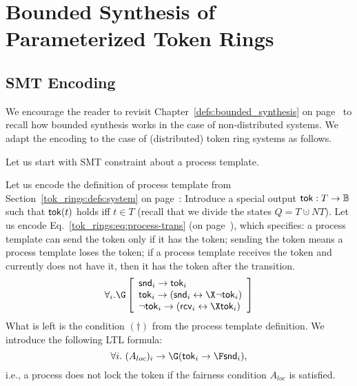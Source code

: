 \section{Bounded Synthesis of Parameterized Token Rings}\label{tok_rings:sec:bs-and-optimizations}

\subsection{SMT Encoding}

We encourage the reader to revisit Chapter~\ref{defs:bounded_synthesis} on page~\pageref{page:defs:bounded_synthesis}
to recall how bounded synthesis works in the case of non-distributed systems.
We adapt the encoding to the case of (distributed) token ring systems as follows.

Let us start with SMT constraint about a process template.

Let us encode the definition of process template from
Section~\ref{tok_rings:defs:system} on page~\pageref{tok_rings:eq:process-trans}:
%
\li
\- Introduce a special output $\mathsf{tok}: T \to \mathbb{B}$
   such that $\mathsf{tok}(t)$ holds iff $t \in T$
   (recall that we divide the states $Q = T\cupdot NT$).
   Let us encode Eq.~\ref{tok_rings:eq:process-trans} (on page~\pageref{tok_rings:eq:process-trans}),
   which specifies:
   a process template can send the token only if it has the token;
   sending the token means a process template loses the token;
   if a process template receives the token and currently does not have it,
   then it has the token after the transition.
   \begin{equation} \label{tok_rings:eq:snd_rcv_tok}
   \forall_i. \G\left[
   \begin{array}{l}
     \tsnd_i \impl \token_i \\
     \token_i \impl (\tsnd_i \iff \X\neg\token_i)\\
     \neg\token_i \impl (\trcv_i \iff \X\token_i)
   \end{array}
   \right]
   \end{equation}
%
\- What is left is the condition $(\dagger)$ from the process template definition.
   We introduce the following LTL formula:
   \begin{equation}\label{tok_rings:eq:tok_release}
   \forall i.~(A_{loc})_i \impl \G(\token_i \impl \F \tsnd_i),
   \end{equation}
   i.e., a process does not lock the token if the fairness condition $A_{loc}$ is satisfied.

